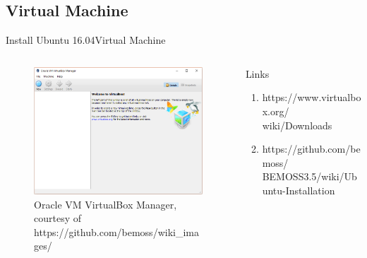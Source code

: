\documentclass{beamer}
\begin{document}

\subsection{Virtual Machine}

\begin{frame}{Install Ubuntu 16.04}{Virtual Machine}
	\begin{columns}[T]
		\begin{column}{0.5\textwidth}
			\begin{figure}
				\centering
				\includegraphics[scale=0.26]{figs/mainpage_virtualbox.png}
				\caption{Oracle VM VirtualBox Manager, 
				courtesy of https://github.com/bemoss/wiki\_images/}
			\end{figure}
		\end{column}
		\begin{column}{0.5\textwidth}
			\begin{block}{Links}
				\begin{enumerate}
					\item https://www.virtualbox.org/
					wiki/Downloads
					\item https://github.com/bemoss/
					BEMOSS3.5/wiki/Ubuntu-Installation
				\end{enumerate}
			\end{block}
		\end{column}
	\end{columns}
\end{frame}

\end{document}
